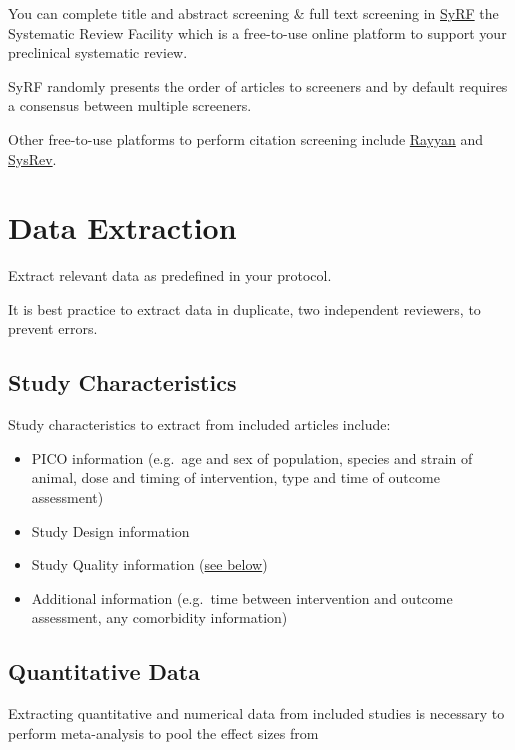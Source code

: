 \documentclass[
]{book}
\begin{document}
You can complete title and abstract screening \& full text screening in \href{http://syrf.org.uk/}{SyRF} the Systematic Review Facility which is a free-to-use online platform to support your preclinical systematic review.

SyRF randomly presents the order of articles to screeners and by default requires a consensus between multiple screeners.

Other free-to-use platforms to perform citation screening include \href{https://rayyan.qcri.org/welcome}{Rayyan} and \href{https://sysrev.com/}{SysRev}.

\hypertarget{data-extraction}{%
\chapter{Data Extraction}\label{data-extraction}}

Extract relevant data as predefined in your protocol.

It is best practice to extract data in duplicate, two independent reviewers, to prevent errors.

\hypertarget{study-characteristics}{%
\section{Study Characteristics}\label{study-characteristics}}

Study characteristics to extract from included articles include:

\begin{itemize}
\item
  PICO information (e.g.~age and sex of population, species and strain of animal, dose and timing of intervention, type and time of outcome assessment)
\item
  Study Design information
\item
  Study Quality information (\protect\hyperlink{Quality-Assessment}{see below})
\item
  Additional information (e.g.~time between intervention and outcome assessment, any comorbidity information)
\end{itemize}

\hypertarget{quantitative-data}{%
\section{Quantitative Data}\label{quantitative-data}}

Extracting quantitative and numerical data from included studies is necessary to perform meta-analysis to pool the effect sizes from
\end{document}
